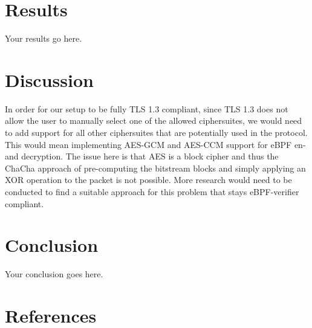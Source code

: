 \documentclass[a4paper,12pt]{article}
\begin{document}

\section{Results}
Your results go here.

\section{Discussion}
In order for our setup to be fully TLS 1.3 compliant, since TLS 1.3 does not allow the user to manually select one of the allowed ciphersuites, 
we would need to add support for all other ciphersuites that are potentially used in the protocol.
This would mean implementing AES-GCM and AES-CCM support for eBPF en- and decryption. 
The issue here is that AES is a block cipher and thus the ChaCha approach of pre-computing the bitstream blocks and simply applying an XOR operation
to the packet is not possible.
More research would need to be conducted to find a suitable approach for this problem that stays eBPF-verifier compliant.

\section{Conclusion}
Your conclusion goes here.

\section{References}
\printbibliography{}
\end{document}
